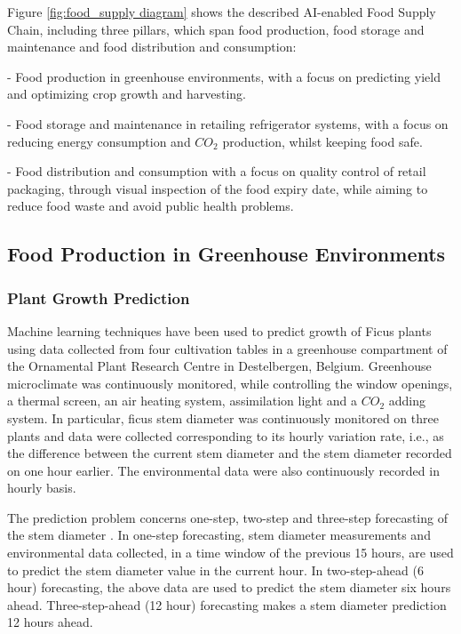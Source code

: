 \documentclass[journal,article,accept,moreauthors,pdftex]{Definitions/mdpi}
\begin{document}
Figure \ref{fig:food_supply diagram} shows the described AI-enabled Food Supply Chain, including three pillars, which span food production, food storage and maintenance and  food distribution and consumption: 

- Food production in greenhouse environments, with a focus on predicting yield and optimizing crop growth and harvesting.

- Food storage and maintenance in retailing refrigerator systems, with a focus on reducing energy consumption and $CO_2$ production, whilst keeping food safe.

- Food distribution and consumption with a focus on quality control of retail packaging, through visual inspection of the food expiry date, while aiming to reduce food waste and avoid public health problems.


\subsection{Food Production in Greenhouse Environments}


\subsubsection{Plant Growth Prediction}
 
 Machine learning techniques have been used to predict growth of Ficus plants using  data  collected  from  four  cultivation  tables  in  a  greenhouse compartment of the Ornamental Plant Research Centre in Destelbergen, Belgium. Greenhouse microclimate was continuously  monitored, while controlling  the  window  openings, a thermal screen, an air heating system, assimilation light and a $CO_{2}$ adding system. In particular, ficus stem  diameter  was  continuously  monitored  on  three  plants and data were collected corresponding to its hourly  variation  rate, i.e.,  as  the difference between the current stem diameter and the stem diameter recorded on one  hour earlier.  The environmental data were also continuously recorded in hourly basis.
 

 
 The prediction problem concerns one-step, two-step and three-step forecasting of the stem diameter \cite{ref106, ref59}. In one-step forecasting, stem diameter measurements and environmental data collected, in a time window of the previous  15  hours, are used to predict the stem diameter value in the current hour. In two-step-ahead (6 hour) forecasting, the above data are used to predict the stem diameter six hours ahead. Three-step-ahead (12 hour) forecasting  makes a stem diameter prediction 12 hours ahead. 
 
\end{document}
